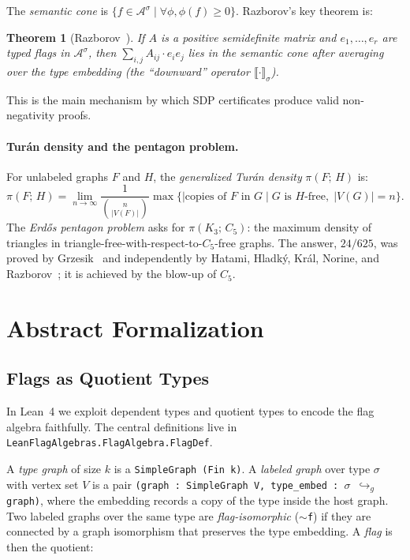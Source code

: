 \documentclass{article}
\newtheorem{theorem}{Theorem}[section]
\newcommand{\FlagAlg}[1]{\mathcal{A}^{#1}}
\newcommand{\tdensity}[2]{\pi(#1;\,#2)}
\newcommand{\lean}[1]{\texttt{#1}}
\begin{document}
The \emph{semantic cone} is $\{f \in \FlagAlg{\sigma} \mid \forall \phi, \phi(f) \geq 0\}$.
Razborov's key theorem is:
\begin{theorem}[Razborov~\cite{razborov2007flag}]
  If $A$ is a positive semidefinite matrix and $e_1,\ldots,e_r$ are typed flags
  in $\FlagAlg{\sigma}$, then $\sum_{i,j} A_{ij} \cdot e_i e_j$ lies in the
  semantic cone after averaging over the type embedding (the ``downward'' operator
  $\llbracket \cdot \rrbracket_\sigma$).
\end{theorem}
This is the main mechanism by which SDP certificates produce valid
non-negativity proofs.

\paragraph{Turán density and the pentagon problem.}
For unlabeled graphs $F$ and $H$, the \emph{generalized Turán density}
$\tdensity{F}{H}$ is:
\[
  \tdensity{F}{H} = \lim_{n\to\infty} \frac{1}{\binom{n}{|V(F)|}}
  \max\bigl\{|\text{copies of } F \text{ in } G \mid G \text{ is } H\text{-free},\; |V(G)|=n\bigr\}.
\]
The \emph{Erd\H{o}s pentagon problem} asks for $\tdensity{K_3}{C_5}$: the
maximum density of triangles in triangle-free-with-respect-to-$C_5$-free
graphs.  The answer, $24/625$, was proved by Grzesik~\cite{grzesik2012} and
independently by Hatami, Hladk\'y, Kr\'al, Norine, and
Razborov~\cite{hatami2012}; it is achieved by the blow-up of $C_5$.

\section{Abstract Formalization}
\label{sec:abstract}

\subsection{Flags as Quotient Types}

In Lean~4 we exploit dependent types and quotient types to encode the flag
algebra faithfully.  The central definitions live in
\lean{LeanFlagAlgebras.FlagAlgebra.FlagDef}.

A \emph{type graph} of size $k$ is a \lean{SimpleGraph (Fin k)}.  A
\emph{labeled graph} over type $\sigma$ with vertex set $V$ is a pair
\lean{(graph : SimpleGraph V, type\_embed : $\sigma$ $\hookrightarrow_g$ graph)},
where the embedding records a copy of the type inside the host graph.  Two
labeled graphs over the same type are \emph{flag-isomorphic} (\lean{$\sim$f})
if they are connected by a graph isomorphism that preserves the type embedding.
A \emph{flag} is then the quotient:
\end{document}
